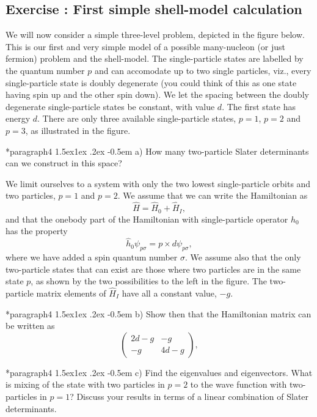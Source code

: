 \documentclass[%
twoside,                 %
final,                   %
10pt]{article}
\makeatletter
\newenvironment{doconceexercise}{}{}
\newcounter{doconceexercisecounter}
\newcommand\subex{\@startsection*{paragraph}{4}{\z@}%
                  {1.5ex\@plus1ex \@minus.2ex}%
                  {-0.5em}%
                  {\normalfont\normalsize\bfseries}}
\makeatother
\begin{document}
\begin{doconceexercise}

\subsection*{Exercise \thedoconceexercisecounter: First simple shell-model calculation}


We will now consider a simple three-level problem, depicted in the figure below. This is our first and very simple model of a possible many-nucleon (or just fermion) problem and the shell-model.
The single-particle states are labelled by the quantum number $p$ and can accomodate up to two single particles,  viz., every single-particle state  is doubly degenerate (you could think of this as one state having spin up and the other spin down). 
We let the spacing between the doubly degenerate single-particle states be constant, with value $d$.  The first state
has energy $d$. There are only three available single-particle states, $p=1$, $p=2$ and $p=3$, as illustrated
in the figure.


\subex{a)}
How many two-particle Slater determinants can we construct in this space? 

We limit ourselves to a system with only the two lowest single-particle orbits and two particles, $p=1$ and $p=2$. We assume that we can write the Hamiltonian as
\[
       \hat{H}=\hat{H}_0+\hat{H}_I,
\]
and that the onebody part of the Hamiltonian with single-particle operator $\hat{h}_0$ has the property
\[
\hat{h}_0\psi_{p\sigma} = p\times d \psi_{p\sigma},
\]
where we have added a spin quantum number $\sigma$. 
We assume also that the only two-particle states that can exist are those where two particles are in the 
same state $p$, as shown by the two possibilities to the left in the figure.
The two-particle matrix elements of $\hat{H}_I$ have all a constant value, $-g$.

\subex{b)}
Show then that the Hamiltonian matrix can be written as 
\[
\left(\begin{array}{cc}2d-g &-g \\
-g &4d-g \end{array}\right),
\]

\subex{c)}
Find the eigenvalues and eigenvectors.  What is mixing of the state with two particles in $p=2$  to the wave function with two-particles in $p=1$? Discuss your results in terms of a linear combination of Slater determinants.


\end{doconceexercise}
\end{document}
